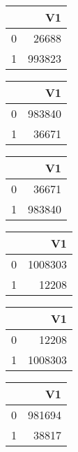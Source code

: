 \bigskip\bigskip
\centering
\begin{tabular}{rr}
  \hline
 & V1 \\ 
  \hline
0 & 26688 \\ 
  1 & 993823 \\ 
   \hline
\end{tabular}

\bigskip\bigskip
\centering
\begin{tabular}{rr}
  \hline
 & V1 \\ 
  \hline
0 & 983840 \\ 
  1 & 36671 \\ 
   \hline
\end{tabular}

\bigskip\bigskip
\centering
\begin{tabular}{rr}
  \hline
 & V1 \\ 
  \hline
0 & 36671 \\ 
  1 & 983840 \\ 
   \hline
\end{tabular}

\bigskip\bigskip
\centering
\begin{tabular}{rr}
  \hline
 & V1 \\ 
  \hline
0 & 1008303 \\ 
  1 & 12208 \\ 
   \hline
\end{tabular}

\bigskip\bigskip
\centering
\begin{tabular}{rr}
  \hline
 & V1 \\ 
  \hline
0 & 12208 \\ 
  1 & 1008303 \\ 
   \hline
\end{tabular}

\bigskip\bigskip
\centering
\begin{tabular}{rr}
  \hline
 & V1 \\ 
  \hline
0 & 981694 \\ 
  1 & 38817 \\ 
   \hline
\end{tabular}

